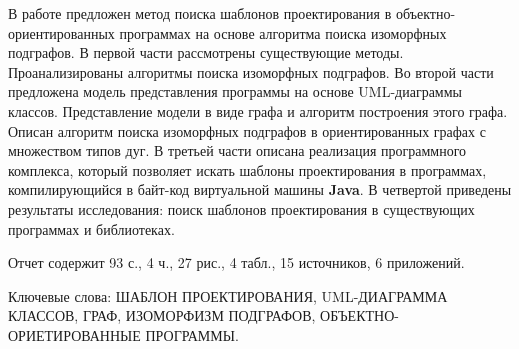 \Referat

В работе предложен метод поиска шаблонов проектирования в объектно-ориентированных
программах на основе алгоритма поиска изоморфных подграфов.
В первой части рассмотрены существующие методы.
Проанализированы алгоритмы поиска изоморфных подграфов.
Во второй части предложена модель представления программы на основе UML-диаграммы классов.
Представление модели в виде графа и алгоритм построения этого графа.
Описан алгоритм поиска изоморфных подграфов в ориентированных графах с множеством
типов дуг.
В третьей части описана реализация программного комплекса, который позволяет
искать шаблоны проектирования в программах, компилирующийся в байт-код
виртуальной машины \textbf{Java}.
В четвертой приведены результаты исследования: поиск шаблонов проектирования
в существующих программах и библиотеках.

Отчет содержит 93 с., 4 ч., 27 рис., 4 табл., 15 источников, 6 приложений.

Ключевые слова: ШАБЛОН ПРОЕКТИРОВАНИЯ, UML-ДИАГРАММА КЛАССОВ, ГРАФ,
ИЗОМОРФИЗМ ПОДГРАФОВ, ОБЪЕКТНО-ОРИЕТИРОВАННЫЕ ПРОГРАММЫ.
